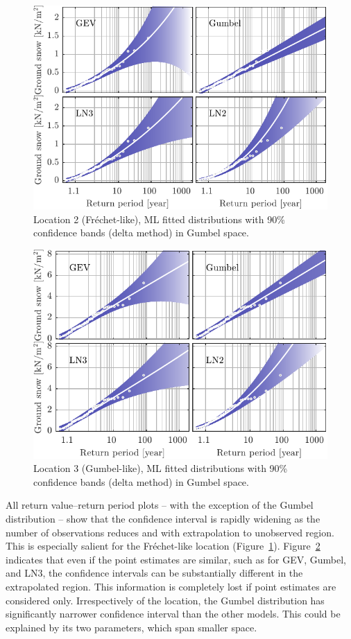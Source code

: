 \begin{figure}[htbp!]
	\centering    
	\includegraphics[]{filled_RP_RV_2x2_ID2735_CI09.pdf}
	\caption{Location 2 (Fréchet-like), ML fitted distributions with 90\% confidence bands (delta method) in Gumbel space.}
	\label{fig:loc2_2x2}
\end{figure}

\begin{figure}[htbp!]
	\centering    
	\includegraphics[]{filled_RP_RV_2x2_ID4553_CI09.pdf}
	\caption{Location 3 (Gumbel-like), ML fitted distributions with 90\% confidence bands (delta method) in Gumbel space.}
	\label{fig:loc3_2x2}
\end{figure}

All return value--return period plots -- with the exception of the Gumbel distribution -- show that the confidence interval is rapidly widening as the number of observations reduces and with extrapolation to unobserved region. This is especially salient for the Fréchet-like location (Figure~\ref{fig:loc2_2x2}). Figure~\ref{fig:loc3_2x2} indicates that even if the point estimates are similar, such as for GEV, Gumbel, and LN3, the confidence intervals can be substantially different in the extrapolated region. This information is completely lost if point estimates are considered only. Irrespectively of the location, the Gumbel distribution has significantly narrower confidence interval than the other models. This could be explained by its two parameters, which span smaller space.

